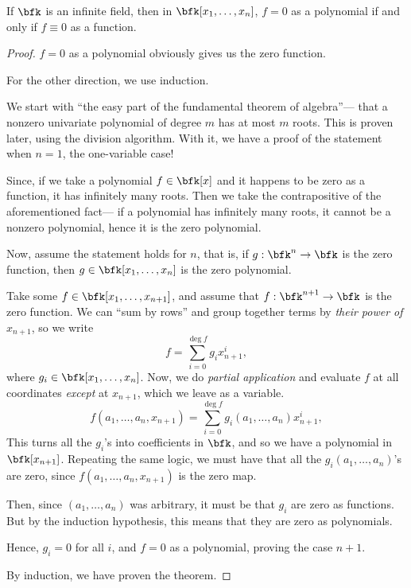 \documentclass{article}
\DeclareMathOperator{\degree}{deg}
\begin{document}
\begin{proposition}\label{prop:polyidenttrick}
    If $\bfk$ is an infinite field, then in $\bfk[x_1,\ldots,x_n]$, $f = 0$ as a polynomial if and only if $f \equiv 0$ as a function.
\end{proposition}

\begin{proof}
    $f=0$ as a polynomial obviously gives us the zero function.

    For the other direction, we use induction.

    We start with ``the easy part of the fundamental theorem of algebra''--- that a nonzero univariate polynomial of degree $m$ has at most $m$ roots.
    This is proven later, using the division algorithm.
    With it, we have a proof of the statement when $n=1$, the one-variable case!

    Since, if we take a polynomial $f \in \bfk[x]$ and it happens to be zero as a function, it has infinitely many roots.
    Then we take the contrapositive of the aforementioned fact--- if a polynomial  has infinitely many roots, it cannot be a nonzero polynomial, hence it is the zero polynomial.

    Now, assume the statement holds for $n$, that is, if $g: \bfk^n \to \bfk$ is the zero function, then $g \in \bfk[x_1,\ldots,x_n]$ is the zero polynomial.

    Take some $f \in \bfk[x_1,\ldots,x_{n+1}]$, and assume that $f:\bfk^{n+1} \to \bfk$ is the zero function.
    We can ``sum by rows'' and group together terms by \textit{their power of $x_{n+1}$}, so we write
    \[
        f = \sum_{i=0}^{\degree f} g_i x^i_{n+1},
    \]
    where $g_i \in \bfk[x_1,\ldots,x_n]$.
    Now, we do \textit{partial application} and evaluate $f$ at all coordinates \textit{except} at $x_{n+1}$, which we leave as a variable.
    \[
        f(a_1,\ldots,a_n,x_{n+1}) = \sum_{i=0}^{\degree f} g_i(a_1,\ldots,a_n) x^i_{n+1},
    \]
    This turns all the $g_i$'s into coefficients in $\bfk$, and so we have a polynomial in $\bfk[x_{n+1}]$.
    Repeating the same logic, we must have that all the $g_i(a_1,\ldots,a_n)$'s are zero, since $f(a_1,\ldots,a_n,x_{n+1})$ is the zero map.

    Then, since $(a_1,\ldots,a_n)$ was arbitrary, it must be that $g_i$ are zero as functions.
    But by the induction hypothesis, this means that they are zero as polynomials.

    Hence, $g_i = 0$ for all $i$, and $f = 0$ as a polynomial, proving the case $n+1$.

    By induction, we have proven the theorem.
\end{proof}
\end{document}
